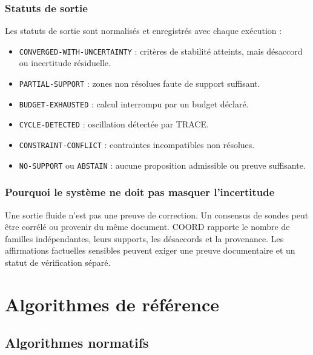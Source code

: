 \documentclass[11pt,a4paper,oneside]{report}
\begin{document}
\section{Statuts de sortie}
Les statuts de sortie sont normalisés et enregistrés avec chaque exécution :
\begin{itemize}
\item \texttt{CONVERGED-WITH-UNCERTAINTY} : critères de stabilité atteints, mais désaccord ou incertitude résiduelle.
\item \texttt{PARTIAL-SUPPORT} : zones non résolues faute de support suffisant.
\item \texttt{BUDGET-EXHAUSTED} : calcul interrompu par un budget déclaré.
\item \texttt{CYCLE-DETECTED} : oscillation détectée par TRACE.
\item \texttt{CONSTRAINT-CONFLICT} : contraintes incompatibles non résolues.
\item \texttt{NO-SUPPORT} ou \texttt{ABSTAIN} : aucune proposition admissible ou preuve suffisante.
\end{itemize}

\section{Pourquoi le système ne doit pas masquer l'incertitude}
Une sortie fluide n'est pas une preuve de correction. Un consensus de sondes peut être corrélé ou provenir du même document. COORD rapporte le nombre de familles indépendantes, leurs supports, les désaccords et la provenance. Les affirmations factuelles sensibles peuvent exiger une preuve documentaire et un statut de vérification séparé.

\part{Algorithmes de référence}
\chapter{Algorithmes normatifs}
\end{document}
